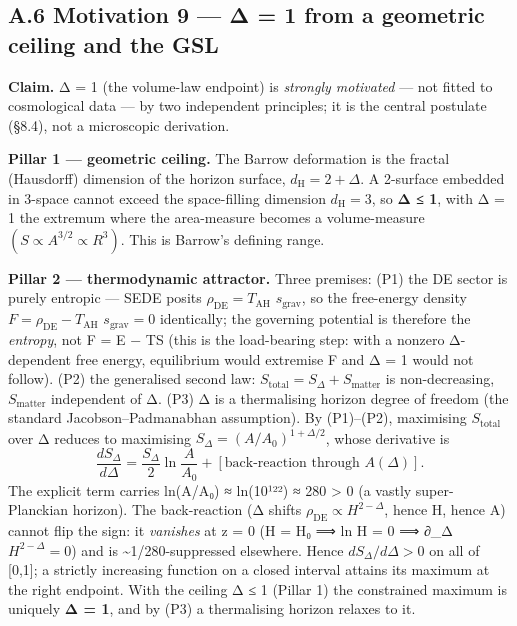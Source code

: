 \documentclass[
  10pt,
]{article}
\begin{document}
\subsection{A.6 Motivation 9 --- Δ = 1 from a geometric ceiling and the
GSL}\label{a.6-motivation-9-ux3b4-1-from-a-geometric-ceiling-and-the-gsl}

\textbf{Claim.} Δ = 1 (the volume-law endpoint) is \emph{strongly
motivated} --- not fitted to cosmological data --- by two independent
principles; it is the central postulate (§8.4), not a microscopic
derivation.

\textbf{Pillar 1 --- geometric ceiling.} The Barrow deformation is the
fractal (Hausdorff) dimension of the horizon surface,
\(d_{\mathrm{H}} = 2 + \Delta\). A 2-surface embedded in 3-space cannot
exceed the space-filling dimension \(d_{\mathrm{H}} = 3\), so \textbf{Δ
≤ 1}, with Δ = 1 the extremum where the area-measure becomes a
volume-measure \((S \propto  A^{3/2} \propto  R^{3})\). This is Barrow's
defining range.

\textbf{Pillar 2 --- thermodynamic attractor.} Three premises: (P1) the
DE sector is purely entropic --- SEDE posits
\(\rho _{\mathrm{DE}} = T_{\mathrm{AH}}\) \(s_{\mathrm{grav}}\), so the
free-energy density \(F = \rho _{\mathrm{DE}} - T_{\mathrm{AH}}\)
\(s_{\mathrm{grav}} = 0\) identically; the governing potential is
therefore the \emph{entropy}, not F = E − TS (this is the load-bearing
step: with a nonzero Δ-dependent free energy, equilibrium would
extremise F and Δ = 1 would not follow). (P2) the generalised second
law: \(S_{\mathrm{total}} = S_\Delta  + S_{\mathrm{matter}}\) is
non-decreasing, \(S_{\mathrm{matter}}\) independent of Δ. (P3) Δ is a
thermalising horizon degree of freedom (the standard
Jacobson--Padmanabhan assumption). By (P1)--(P2), maximising
\(S_{\mathrm{total}}\) over Δ reduces to maximising
\(S_\Delta  = (A/A_{0})^{1+\Delta /2}\), whose derivative is
\[\frac{dS_\Delta}{d\Delta} = \frac{S_\Delta}{2}\ln\!\frac{A}{A_0} + [\text{back-reaction through }A(\Delta)].\]
The explicit term carries ln(A/A₀) ≈ ln(10¹²²) ≈ 280 \textgreater{} 0 (a
vastly super-Planckian horizon). The back-reaction (Δ shifts
\(\rho _{\mathrm{DE}} \propto  H^{2-\Delta }\), hence H, hence A) cannot
flip the sign: it \emph{vanishes} at z = 0 (H = H₀ ⟹ ln H = 0 ⟹ ∂\_Δ
\(H^{2-\Delta } = 0\)) and is \textasciitilde1/280-suppressed elsewhere.
Hence \(dS_\Delta /d\Delta  > 0\) on all of {[}0,1{]}; a strictly
increasing function on a closed interval attains its maximum at the
right endpoint. With the ceiling Δ ≤ 1 (Pillar 1) the constrained
maximum is uniquely \textbf{Δ = 1}, and by (P3) a thermalising horizon
relaxes to it.
\end{document}

